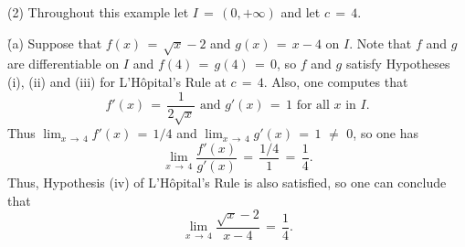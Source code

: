 {\V

        (2) Throughout this example let $I \,=\, (0,+{\infty})$ and let $c \,=\, 4$.

        \h (a) Suppose that $f(x) \,=\, \sqrt{x}-2$ and $g(x) \,=\, x-4$ on $I$.
    Note that $f$ and $g$ are differentiable on $I$ and $f(4) \,=\, g(4) \,=\, 0$,
    so $f$ and $g$ satisfy Hypotheses (i), (ii) and (iii) for L'H\^{o}pital's Rule at $c \,=\, 4$. Also, one computes that
        \begin{displaymath}
        f'(x) \,=\, \frac{1}{2\sqrt{x}} \mbox{ and } g'(x) \,=\, 1 \mbox{ for all $x$ in $I$}.
        \end{displaymath}
    Thus $\lim_{x \,{\rightarrow}\, 4} f'(x) \,=\, 1/4$ and $\lim_{x \,{\rightarrow}\, 4} g'(x) \,=\, 1 \,\,{\neq}\,\, 0$, so one has
        \begin{displaymath}
        \lim_{x \,{\rightarrow}\, 4} \frac{f'(x)}{g'(x)} \,=\, \frac{1/4}{1} \,=\, \frac{1}{4}.
        \end{displaymath}
    Thus, Hypothesis (iv) of L'H\^{o}pital's Rule is also satisfied, so one can conclude that
        \begin{displaymath}
        \lim_{x \,{\rightarrow}\, 4} \frac{\sqrt{x}-2}{x-4} \,=\, \frac{1}{4}.
        \end{displaymath}

}

